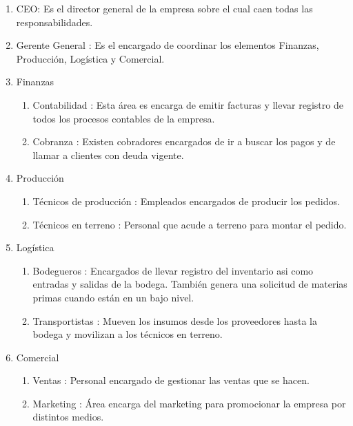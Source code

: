 	\begin{enumerate}
	\item CEO: Es el director general de la empresa sobre el cual caen todas las responsabilidades.
	\item Gerente General : Es el encargado de coordinar los elementos Finanzas, Producción, Logística y Comercial.
	\item Finanzas
	  \begin{enumerate}
	  \item Contabilidad : Esta área es encarga de emitir facturas y llevar registro de todos los procesos contables de la empresa.
	  \item Cobranza : Existen cobradores encargados de ir a buscar los pagos y de llamar a clientes con deuda vigente.
	  \end{enumerate}
	\item Producción
	  \begin{enumerate}
	    \item Técnicos de producción : Empleados encargados de producir los pedidos.
	    \item Técnicos en terreno : Personal que acude a terreno para montar el pedido.
	  \end{enumerate}
	    \item Logística
	  \begin{enumerate}
	    \item Bodegueros : Encargados de llevar registro del inventario asi como entradas y salidas de la bodega. También genera una solicitud de materias primas cuando están en un bajo nivel.
	    \item Transportistas : Mueven los insumos desde los proveedores hasta la bodega y movilizan a los técnicos en terreno.
	  \end{enumerate}
	\item Comercial
	  \begin{enumerate}
	    \item Ventas : Personal encargado de gestionar las ventas que se hacen.
	    \item Marketing : Área encarga del marketing para promocionar la empresa por distintos medios.\newpage
	  \end{enumerate}
	\end{enumerate}
	
